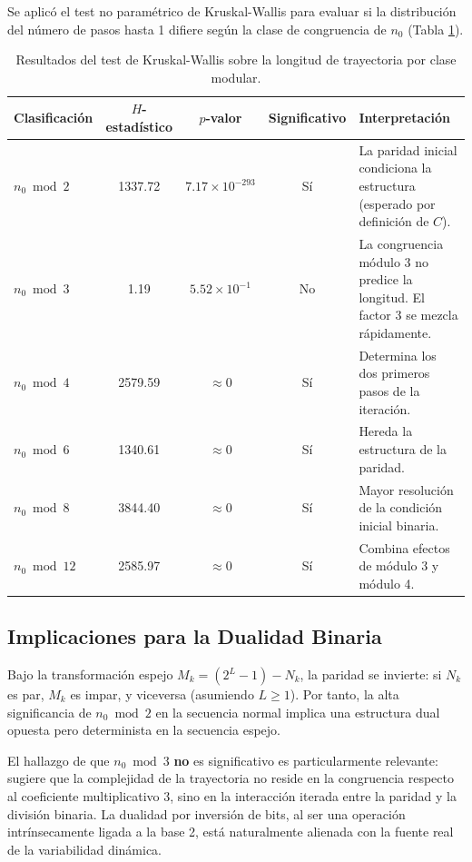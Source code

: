 \documentclass[11pt,a4paper]{article}
\begin{document}
Se aplicó el test no paramétrico de Kruskal-Wallis para evaluar si la distribución del número de pasos hasta 1 difiere según la clase de congruencia de $n_0$ (Tabla \ref{tab:kruskal}).

\begin{table}[h!]
\centering
\caption{Resultados del test de Kruskal-Wallis sobre la longitud de trayectoria por clase modular.}
\label{tab:kruskal}
\begin{tabular}{lcccl}
\toprule
Clasificación & $H$-estadístico & $p$-valor & Significativo & Interpretación \\
\midrule
$n_0 \bmod 2$  & 1337.72  & $7.17 \times 10^{-293}$ & Sí & La paridad inicial condiciona la estructura (esperado por definición de $C$). \\
$n_0 \bmod 3$  & 1.19     & $5.52 \times 10^{-1}$   & No & La congruencia módulo 3 no predice la longitud. El factor 3 se mezcla rápidamente. \\
$n_0 \bmod 4$  & 2579.59  & $\approx 0$             & Sí & Determina los dos primeros pasos de la iteración. \\
$n_0 \bmod 6$  & 1340.61  & $\approx 0$             & Sí & Hereda la estructura de la paridad. \\
$n_0 \bmod 8$  & 3844.40  & $\approx 0$             & Sí & Mayor resolución de la condición inicial binaria. \\
$n_0 \bmod 12$ & 2585.97  & $\approx 0$             & Sí & Combina efectos de módulo 3 y módulo 4. \\
\bottomrule
\end{tabular}
\end{table}

\subsection{Implicaciones para la Dualidad Binaria}

Bajo la transformación espejo $M_k = (2^L-1) - N_k$, la paridad se invierte: si $N_k$ es par, $M_k$ es impar, y viceversa (asumiendo $L \geq 1$). Por tanto, la alta significancia de $n_0 \bmod 2$ en la secuencia normal implica una estructura dual opuesta pero determinista en la secuencia espejo.

El hallazgo de que $n_0 \bmod 3$ \textbf{no} es significativo es particularmente relevante: sugiere que la complejidad de la trayectoria no reside en la congruencia respecto al coeficiente multiplicativo 3, sino en la interacción iterada entre la paridad y la división binaria. La dualidad por inversión de bits, al ser una operación intrínsecamente ligada a la base 2, está naturalmente alienada con la fuente real de la variabilidad dinámica.
\end{document}
